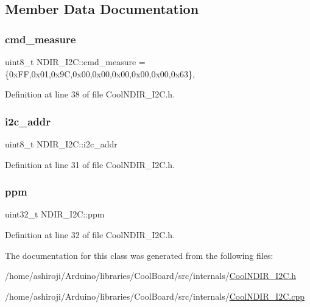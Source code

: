\subsection{Member Data Documentation}
\mbox{\label{class_n_d_i_r___i2_c_af47e04052a5fb25c79e7142b673aae28}} 
\subsubsection{\texorpdfstring{cmd\+\_\+measure}{cmd\_measure}}
{\footnotesize\ttfamily uint8\+\_\+t N\+D\+I\+R\+\_\+\+I2\+C\+::cmd\+\_\+measure = \{0x\+F\+F,0x01,0x9\+C,0x00,0x00,0x00,0x00,0x00,0x63\}\hspace{0.3cm}{\ttfamily [static]}, {\ttfamily [private]}}



Definition at line 38 of file Cool\+N\+D\+I\+R\+\_\+\+I2\+C.\+h.

\mbox{\label{class_n_d_i_r___i2_c_aac12069dd5a86a9ec6aa31ac9a44aabe}} 
\subsubsection{\texorpdfstring{i2c\+\_\+addr}{i2c\_addr}}
{\footnotesize\ttfamily uint8\+\_\+t N\+D\+I\+R\+\_\+\+I2\+C\+::i2c\+\_\+addr}



Definition at line 31 of file Cool\+N\+D\+I\+R\+\_\+\+I2\+C.\+h.

\mbox{\label{class_n_d_i_r___i2_c_a7e5cfc725dba0f9c2bd1bd5ab3bb8600}} 
\subsubsection{\texorpdfstring{ppm}{ppm}}
{\footnotesize\ttfamily uint32\+\_\+t N\+D\+I\+R\+\_\+\+I2\+C\+::ppm}



Definition at line 32 of file Cool\+N\+D\+I\+R\+\_\+\+I2\+C.\+h.



The documentation for this class was generated from the following files\+:\begin{DoxyCompactItemize}
\item 
/home/ashiroji/\+Arduino/libraries/\+Cool\+Board/src/internals/\hyperlink{_cool_n_d_i_r___i2_c_8h}{Cool\+N\+D\+I\+R\+\_\+\+I2\+C.\+h}\item 
/home/ashiroji/\+Arduino/libraries/\+Cool\+Board/src/internals/\hyperlink{_cool_n_d_i_r___i2_c_8cpp}{Cool\+N\+D\+I\+R\+\_\+\+I2\+C.\+cpp}\end{DoxyCompactItemize}
